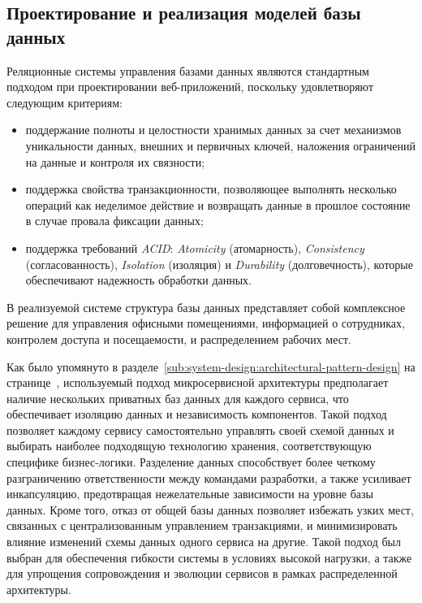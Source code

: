 \subsection{Проектирование и реализация моделей базы данных}
\label{sub:system-design:database-model}

Реляционные системы управления базами данных являются стандартным подходом при проектировании веб-приложений, поскольку удовлетворяют следующим критериям:

\begin{itemize}
    \item поддержание полноты и целостности хранимых данных за счет механизмов уникальности данных, внешних и первичных ключей, наложения ограничений на данные и контроля их связности;
    \item поддержка свойства транзакционности, позволяющее выполнять нес\-коль\-ко операций как неделимое действие и возвращать данные в прошлое состояние в случае провала фиксации данных;
    \item поддержка требований \textit{ACID}: \textit{Atomicity} (атомарность), \textit{Consistency} (согласованность), \textit{Isolation} (изоляция) и \textit{Durability} (долговечность), которые обеспечивают надежность обработки данных.
\end{itemize}

В реализуемой системе структура базы данных представляет собой комплексное решение для управления офисными помещениями, информацией о сотрудниках, контролем доступа и посещаемости, и распределением рабочих мест. 

Как было упомянуто в разделе~\ref{sub:system-design:architectural-pattern-design} на странице~\pageref{page:system-design:architectural-pattern-design:microservices-list}, используемый подход микросервисной архитектуры предполагает наличие нескольких приватных баз данных для каждого сервиса, что обеспечивает изоляцию данных и независимость компонентов. Такой подход позволяет каждому сервису самостоятельно управлять своей схемой данных и выбирать наиболее подходящую технологию хранения, соответствующую специфике бизнес-логики. Разделение данных способствует более четкому разграничению ответственности между командами разработки, а также усиливает инкапсуляцию, предотвращая нежелательные зависимости на уровне базы данных. Кроме того, отказ от общей базы данных позволяет избежать узких мест, связанных с централизованным управлением транзакциями, и минимизировать влияние изменений схемы данных одного сервиса на другие. Такой подход был выбран для обеспечения гибкости системы в условиях высокой нагрузки, а также для упрощения сопровождения и эволюции сервисов в рамках распределенной архитектуры.

